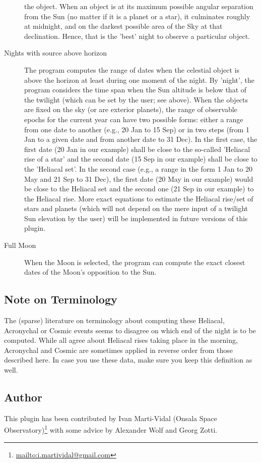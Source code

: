 \begin{description}
  the object. When an object is at its maximum possible angular
  separation from the Sun (no matter if it is a planet or a star), it
  culminates roughly at midnight, and on the darkest possible area of
  the Sky at that declination. Hence, that is the 'best' night to
  observe a particular object.
\item[Nights with source above horizon] The program computes the range
  of dates when the celestial object is above the horizon at least
  during one moment of the night. By 'night', the program considers
  the time span when the Sun altitude is below that of the twilight
  (which can be set by the user; see above). When the objects are
  fixed on the sky (or are exterior planets), the range of observable
  epochs for the current year can have two possible forms: either a
  range from one date to another (e.g., 20 Jan to 15 Sep) or in two
  steps (from 1 Jan to a given date and from another date to 31
  Dec). In the first case, the first date (20 Jan in our example)
  shall be close to the so-called 'Heliacal rise of a star' and the
  second date (15 Sep in our example) shall be close to the 'Heliacal
  set'. In the second case (e.g., a range in the form 1 Jan to 20 May
  and 21 Sep to 31 Dec), the first date (20 May in our example) would
  be close to the Heliacal set and the second one (21 Sep in our
  example) to the Heliacal rise. More exact equations to estimate the
  Heliacal rise/set of stars and planets (which will not depend on the
  mere input of a twilight Sun elevation by the user) will be
  implemented in future versions of this plugin.
\item[Full Moon] When the Moon is selected, the program can compute
  the exact closest dates of the Moon's opposition to the Sun.
\end{description}

\subsection*{Note on Terminology}

The (sparse) literature on terminology about computing these Heliacal, Acronychal or Cosmic events 
seems to disagree on which end of the night is to be computed. While all agree about 
Heliacal rises taking place in the morning, Acronychal and Cosmic are sometimes applied 
in reverse order from those described here. In case you use these data, make sure you 
keep this definition as well. 

\subsection*{Author}
\label{sec:plugins:Observability:author}
This plugin has been contributed by Ivan Marti-Vidal (Onsala Space Observatory)\footnote{\url{mailto:i.martividal@gmail.com}} with some advice by Alexander Wolf and Georg Zotti.

